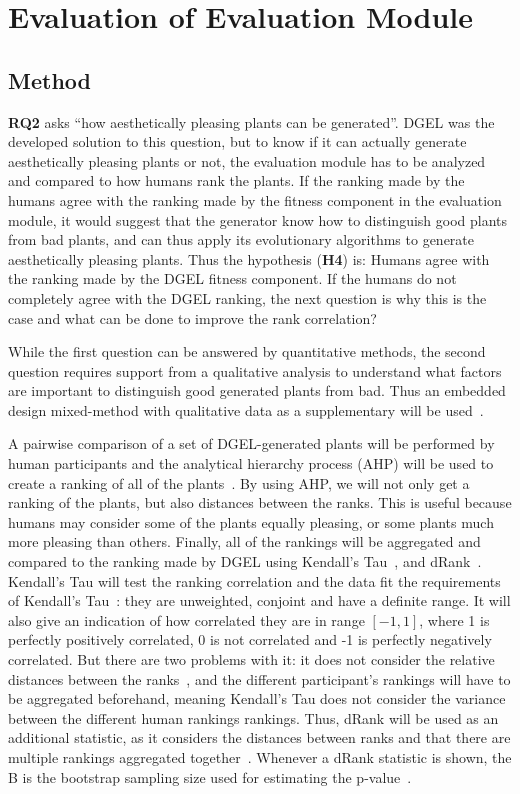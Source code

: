 \section{Evaluation of Evaluation Module}
\subsection{Method}
\textbf{RQ2} asks ``how aesthetically pleasing plants can be generated''.
\gls{DGEL} was the developed solution to this question, but to know if it can actually generate aesthetically pleasing plants or not, the evaluation module has to be analyzed and compared to how humans rank the plants.
If the ranking made by the humans agree with the ranking made by the fitness component in the evaluation module, it would suggest that the generator know how to distinguish good plants from bad plants, and can thus apply its evolutionary algorithms to generate aesthetically pleasing plants.
Thus the hypothesis (\textbf{H4}) is: Humans agree with the ranking made by the \gls{DGEL} fitness component.
If the humans do not completely agree with the \gls{DGEL} ranking, the next question is why this is the case and what can be done to improve the rank correlation?

While the first question can be answered by quantitative methods, the second question requires support from a qualitative analysis to understand what factors are important to distinguish good generated plants from bad.
Thus an embedded design mixed-method with qualitative data as a supplementary will be used~\cite{PracticalResearch}.

A pairwise comparison of a set of \gls{DGEL}-generated plants will be performed by human participants and the analytical hierarchy process (AHP) will be used to create a ranking of all of the plants~\cite{2008Saaty}.
By using AHP, we will not only get a ranking of the plants, but also distances between the ranks.
This is useful because humans may consider some of the plants equally pleasing, or some plants much more pleasing than others.
Finally, all of the rankings will be aggregated and compared to the ranking made by \gls{DGEL} using Kendall's Tau~\cite{1938Kendall}, and dRank~\cite{2009Carterette}.
Kendall's Tau will test the ranking correlation and the data fit the requirements of Kendall's Tau~\cite{2010Webber}: they are unweighted, conjoint and have a definite range.
It will also give an indication of how correlated they are in range $[-1, 1]$, where 1 is perfectly positively correlated, 0 is not correlated and -1 is perfectly negatively correlated.
But there are two problems with it: it does not consider the relative distances between the ranks~\cite{2010Webber}, and the different participant's rankings will have to be aggregated beforehand, meaning Kendall's Tau does not consider the variance between the different human rankings rankings.
Thus, dRank will be used as an additional statistic, as it considers the distances between ranks and that there are multiple rankings aggregated together~\cite{2010Webber,2009Carterette}.
Whenever a dRank statistic is shown, the B is the bootstrap sampling size used for estimating the p-value~\cite{2009Carterette}.

